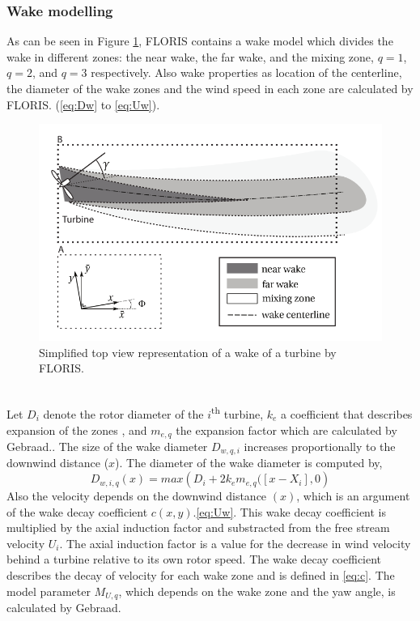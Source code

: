 \subsubsection{Wake modelling}
\label{wakemodel}
As can be seen in Figure \ref{fig:wake}, FLORIS  contains a wake model which divides the wake in different zones: the near wake, the far wake, and  the mixing zone, $q = 1$, $q = 2$, and $q = 3$ respectively. Also  wake properties as location of the centerline, the diameter of the wake zones and the wind speed in each zone are calculated by FLORIS.
(\ref{eq:Dw} to \ref{eq:Uw}). 
\begin{figure}
  	\includegraphics[width=\linewidth]{./Figures/WakeFLORIS.png}
  	\caption{Simplified top view representation of a wake of a turbine by FLORIS.\cite{Gebraad2016}   }
	\label{fig:wake}
\end{figure}
\\
Let $D_i$ denote the rotor diameter of the $i${\textsuperscript{th}} turbine, $k_e$ a coefficient that describes expansion of the zones , and $m_{e,q}$ the expansion factor which are calculated by Gebraad.\cite{Gebraad2016}. The size of the wake diameter $D_{w,q,i}$ increases proportionally to  the downwind distance ($x$). The diameter of the wake diameter is computed by,
\begin{equation}
\label{eq:Dw}
D_{w,i,q}(x) = max({D_i + 2k_em_{e,q}([x - X_i],0} )
\end{equation}
Also the velocity depends on the downwind distance $(x)$, which is an argument of the wake decay coefficient $c(x,y)$.\ref{eq:Uw}. This wake decay coefficient is multiplied by the axial induction factor and substracted from the free stream velocity $U_i$. The axial induction factor is a value for the decrease in wind velocity behind a turbine relative to its own rotor speed. The wake decay coefficient describes the decay of velocity for each wake zone and is defined in \ref{eq:c}. The model parameter $M_{U,q}$, which depends on the wake zone and the yaw angle, is calculated by Gebraad.\cite{Gebraad2016}   

